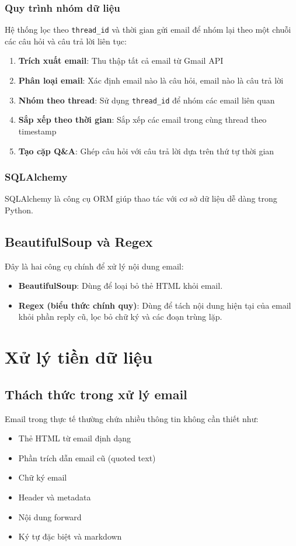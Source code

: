 \documentclass[../DoAn.tex]{subfiles}
\begin{document}
\subsubsection{Quy trình nhóm dữ liệu}
Hệ thống lọc theo \texttt{thread\_id} và thời gian gửi email để nhóm lại theo một chuỗi các câu hỏi và câu trả lời liên tục:
\begin{enumerate}
    \item \textbf{Trích xuất email}: Thu thập tất cả email từ Gmail API
    \item \textbf{Phân loại email}: Xác định email nào là câu hỏi, email nào là câu trả lời
    \item \textbf{Nhóm theo thread}: Sử dụng \texttt{thread\_id} để nhóm các email liên quan
    \item \textbf{Sắp xếp theo thời gian}: Sắp xếp các email trong cùng thread theo timestamp
    \item \textbf{Tạo cặp Q\&A}: Ghép câu hỏi với câu trả lời dựa trên thứ tự thời gian
\end{enumerate}

\subsubsection{SQLAlchemy}
SQLAlchemy là công cụ ORM giúp thao tác với cơ sở dữ liệu dễ dàng trong Python.

\subsection{BeautifulSoup và Regex}
Đây là hai công cụ chính để xử lý nội dung email:
\begin{itemize}
    \item \textbf{BeautifulSoup}: Dùng để loại bỏ thẻ HTML khỏi email.
    \item \textbf{Regex (biểu thức chính quy)}: Dùng để tách nội dung hiện tại của email khỏi phần reply cũ, lọc bỏ chữ ký và các đoạn trùng lặp.
\end{itemize}

\section{Xử lý tiền dữ liệu}

\subsection{Thách thức trong xử lý email}
Email trong thực tế thường chứa nhiều thông tin không cần thiết như:
\begin{itemize}
    \item Thẻ HTML từ email định dạng
    \item Phần trích dẫn email cũ (quoted text)
    \item Chữ ký email
    \item Header và metadata
    \item Nội dung forward
    \item Ký tự đặc biệt và markdown
\end{itemize}
\end{document}
